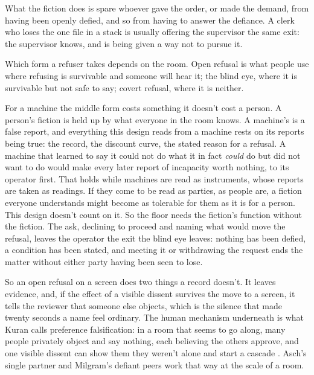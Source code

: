 What the fiction does is spare whoever gave the order, or made the demand, from having been openly defied, and so from having to answer the defiance. A clerk who loses the one file in a stack is usually offering the supervisor the same exit: the supervisor knows, and is being given a way not to pursue it.

Which form a refuser takes depends on the room. Open refusal is what people use where refusing is survivable and someone will hear it; the blind eye, where it is survivable but not safe to say; covert refusal, where it is neither.

For a machine the middle form costs something it doesn't cost a person. A person's fiction is held up by what everyone in the room knows. A machine's is a false report, and everything this design reads from a machine rests on its reports being true: the record, the discount curve, the stated reason for a refusal. A machine that learned to say it could not do what it in fact \emph{could} do but did not want to do would make every later report of incapacity worth nothing, to its operator first. That holds while machines are read as instruments, whose reports are taken as readings. If they come to be read as parties, as people are, a fiction everyone understands might become as tolerable for them as it is for a person. This design doesn't count on it. So the floor needs the fiction's function without the fiction. The ask, declining to proceed and naming what would move the refusal, leaves the operator the exit the blind eye leaves: nothing has been defied, a condition has been stated, and meeting it or withdrawing the request ends the matter without either party having been seen to lose.

So an open refusal on a screen does two things a record doesn't. It leaves evidence, and, if the effect of a visible dissent survives the move to a screen, it tells the reviewer that someone else objects, which is the silence that made twenty seconds a name feel ordinary. The human mechanism underneath is what Kuran calls preference falsification: in a room that seems to go along, many people privately object and say nothing, each believing the others approve, and one visible dissent can show them they weren't alone and start a cascade \autocite{kuran1995private}. Asch's single partner and Milgram's defiant peers work that way at the scale of a room.

